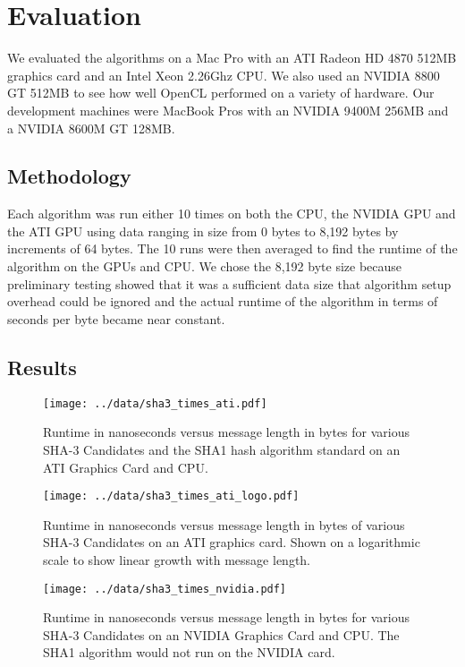 \section*{Evaluation}
We evaluated the algorithms on a Mac Pro with an ATI Radeon HD 4870 512MB graphics card and an Intel Xeon 2.26Ghz CPU.
We also used an NVIDIA 8800 GT 512MB to see how well OpenCL performed on a variety of hardware.
Our development machines were MacBook Pros with an NVIDIA 9400M 256MB and a NVIDIA 8600M GT 128MB.

\subsection*{Methodology}
Each algorithm was run either 10 times on both the CPU, the NVIDIA GPU and the ATI GPU using data ranging in size from 0 bytes to 8,192 bytes by increments of 64 bytes.
The 10 runs were then averaged to find the runtime of the algorithm on the GPUs and CPU.
We chose the 8,192 byte size because preliminary testing showed that it was a sufficient data size that algorithm setup overhead could be ignored and the actual runtime of the algorithm in terms of seconds per byte became near constant.

\subsection*{Results}

\begin{figure}[p]
\texttt{[image: ../data/sha3\_times\_ati.pdf]}
\caption{Runtime in nanoseconds versus message length in bytes for various SHA-3 Candidates and the SHA1 hash algorithm standard on an ATI Graphics Card and CPU.}\label{fig:sha3_times_ati}
\end{figure}

\begin{figure}[p]
\texttt{[image: ../data/sha3\_times\_ati\_logo.pdf]}
\caption{Runtime in nanoseconds versus message length in bytes of various SHA-3 Candidates on an ATI graphics card. Shown on a logarithmic scale to show linear growth with message length.}\label{fig:ati_logo}
\end{figure}

\begin{figure}[p]
\texttt{[image: ../data/sha3\_times\_nvidia.pdf]}
\caption{Runtime in nanoseconds versus message length in bytes for various SHA-3 Candidates on an NVIDIA Graphics Card and CPU. The SHA1 algorithm would not run on the NVIDIA card.}\label{fig:sha3_times_nvidia}
\end{figure}

